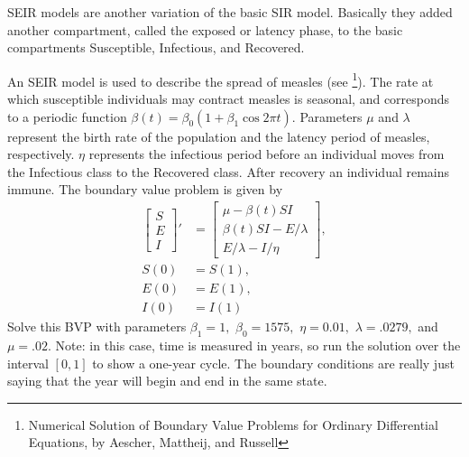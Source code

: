\begin{problem}
SEIR models are another variation of the basic SIR model.
Basically they added another compartment, called the exposed or latency phase, to the basic compartments Susceptible, Infectious, and Recovered. 

An SEIR model is used to describe the spread of measles (see \footnote{Numerical Solution of Boundary Value Problems for Ordinary Differential Equations, by Aescher, Mattheij, and Russell}).
The rate at which susceptible individuals may contract measles is seasonal, and corresponds to a periodic function $\beta(t) = \beta_0(1 + \beta_1 \cos{2\pi t})$.
Parameters $\mu$ and $\lambda$ represent the birth rate of the population and the latency period of measles, respectively.
$\eta$ represents the infectious period before an individual moves from the Infectious class to the Recovered class.
After recovery an individual remains immune.
The boundary value problem is given by
\begin{align*}
\left[\begin{array}{c}S \\ E \\ I\end{array}\right]' &= \left[\begin{array}{c}\mu - \beta(t) S I \\\beta(t) SI - E/\lambda \\E/\lambda - I/\eta\end{array}\right],\\
S(0) &= S(1),\\
E(0) &= E(1),\\
I(0) &= I(1)
\end{align*}
Solve this BVP with parameters $\beta_1 = 1,$ $\beta_0 = 1575,$ $\eta = 0.01,$ $\lambda = .0279,$ and $\mu = .02.$
Note: in this case, time is measured in years, so run the solution over the interval $\left[0, 1\right]$ to show a one-year cycle.
The boundary conditions are really just saying that the year will begin and end in the same state.


\end{problem}
